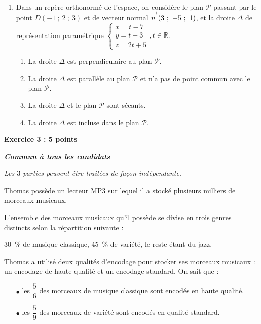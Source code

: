 \documentclass[10pt]{article}
\newcommand{\vect}[1]{\mathchoice%
{\overrightarrow{\displaystyle\mathstrut#1\,\,}}%
{\overrightarrow{\textstyle\mathstrut#1\,\,}}%
{\overrightarrow{\scriptstyle\mathstrut#1\,\,}}%
{\overrightarrow{\scriptscriptstyle\mathstrut#1\,\,}}}
\begin{document}
\begin{enumerate}
\item Dans un repère orthonormé de l'espace, on considère le plan $\mathscr P$ passant par le point $D(-1~;~2~;~3)$ et de vecteur normal $\vect{n}(3~;~-5~;~1)$, et la droite $\Delta$ de représentation paramétrique $\begin{cases}
x = t - 7 \\ y = t + 3 \\ z = 2t + 5
  \end{cases}, t \in \mathbb{R}$.
  	\begin{enumerate}
  		\item La droite $\Delta$ est perpendiculaire au plan $\mathscr P$.
  		\item La droite $\Delta$ est parallèle au plan $\mathscr P$ et n'a pas de point commun avec le plan $\mathscr P$.
  		\item La droite $\Delta$ et le plan $\mathscr P$ sont sécants.
  		\item La droite $\Delta$ est incluse dans le plan $\mathscr P$.
  	\end{enumerate}
\end{enumerate}

\newpage

\textbf{Exercice 3 : \hfill 5 points} 

\emph{\bfseries Commun à tous les candidats}

\medskip

\emph{Les $3$ parties peuvent être traitées de façon indépendante.}

\medskip

Thomas possède un lecteur MP3 sur lequel il a stocké plusieurs milliers de morceaux musicaux.

L'ensemble des morceaux musicaux qu'il possède se divise en trois genres distincts selon la répartition suivante :
\begin{center}
30~\% de musique classique, 45~\% de variété, le reste étant du jazz.
\end{center}

Thomas a utilisé deux qualités d'encodage pour stocker ses morceaux musicaux : un encodage de haute qualité et un encodage standard. On sait que : 
\begin{itemize}
\item[$\bullet$] les $\dfrac{5}{6}$ des morceaux de musique classique sont encodés en haute qualité.
\item[$\bullet$] les $\dfrac{5}{9}$ des morceaux de variété sont encodés en qualité standard.
\end{itemize}
\end{document}
